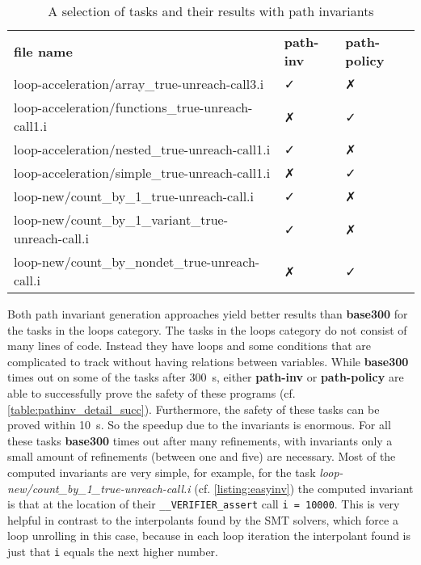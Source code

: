 \begin{table}
 \caption{A selection of tasks and their results with path invariants}
 \label{table:pathinv_detail_succ}
\begin{adjustbox}{max width=\textwidth}
  \begin{tabular}{lll}
  \toprule
  \textbf{file name} & \textbf{path-inv} & \textbf{path-policy} \\
  \cmidrule(lr){1-1}\cmidrule(lr){2-2}\cmidrule(lr){3-3}
loop-acceleration/array\_true-unreach-call3.i & ✓ & ✗ \\
loop-acceleration/functions\_true-unreach-call1.i & ✗ & ✓ \\
loop-acceleration/nested\_true-unreach-call1.i & ✓ & ✗  \\
loop-acceleration/simple\_true-unreach-call1.i & ✗ & ✓ \\
loop-new/count\_by\_1\_true-unreach-call.i & ✓ & ✗ \\
loop-new/count\_by\_1\_variant\_true-unreach-call.i & ✓ & ✗ \\
loop-new/count\_by\_nondet\_true-unreach-call.i & ✗ & ✓ \\
\bottomrule
 \end{tabular}
 \end{adjustbox}

\end{table}

Both path invariant generation approaches yield better results than \textbf{base300} for the tasks in the loops category. The tasks in the loops category do not consist of many lines of code. Instead
they have loops and some conditions that are complicated to track without having relations between variables. While \textbf{base300} times out on some of the tasks after \SI{300}{\second},
either \textbf{path-inv} or \textbf{path-policy} are able to successfully prove the safety of these programs (cf. \autoref{table:pathinv_detail_succ}). Furthermore, the safety of
these tasks can be proved within \SI{10}{\second}. So the 
speedup due to the invariants is enormous. For all these tasks \textbf{base300} times out after many refinements, with invariants only a small amount of refinements (between one and five) are necessary. 
Most of the computed invariants are very simple, for example, for the task \emph{loop-new/count\_by\_1\_true-unreach-call.i} (cf. \autoref{listing:easyinv}) the computed invariant
is that at the location of their \texttt{\_\_VERIFIER\_assert} call \texttt{i = 10000}. This is very helpful in contrast to the interpolants found by the \ac{SMT} solvers, which
force a loop unrolling in this case, because in each loop iteration the interpolant found is just that \texttt{i} equals the next higher number.


